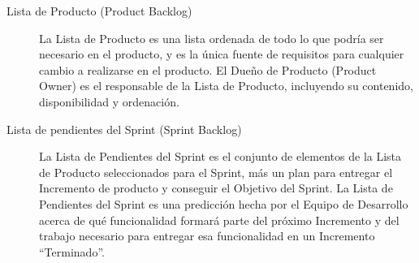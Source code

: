    \begin{description}
      \item[Lista de Producto (Product Backlog)]

      La Lista de Producto es una lista ordenada de todo lo que podría ser necesario en el producto, y es la única fuente de requisitos para cualquier cambio a realizarse en el producto. El Dueño de Producto (Product Owner) es el responsable de la Lista de Producto, incluyendo su contenido, disponibilidad y ordenación.


      \item[Lista de pendientes del Sprint (Sprint Backlog)]

      La Lista de Pendientes del Sprint es el conjunto de elementos de la Lista de Producto seleccionados para el Sprint, más un plan para entregar el Incremento de producto y conseguir el Objetivo del Sprint. La Lista de Pendientes del Sprint es una predicción hecha por el Equipo de Desarrollo acerca de qué funcionalidad formará parte del próximo Incremento y del trabajo necesario para entregar esa funcionalidad en un Incremento “Terminado”.

    \end{description}
